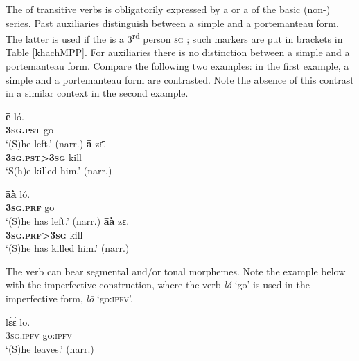 \documentclass[output=paper]{LSP/langsci}
\begin{document}
The  of transitive verbs is obligatorily expressed by a  or a  of the basic (non-) series. Past auxiliaries distinguish between a simple and a portemanteau form. The latter is used if the  is a 3\textsuperscript{rd} person \textsc{sg} ; such markers are put in brackets in  Table \ref{khachMPP}. For  auxiliaries there is no distinction between a simple and a portemanteau form. Compare the following two examples: in the first example, a simple and a portemanteau form are contrasted. Note the absence of this contrast in a similar context in the second example.

\begin{exe} \ex
\label{khachexpst}
\begin{xlist} \ex
\gll \textbf{ē}	ló.\\
\textbf{3\textsc{sg}.\textsc{pst}} go\\
\glt ‘(S)he left.’ (narr.)
\ex
\gll \textbf{ā}		zɛ̄.	\\
\textbf{3\textsc{sg}.\textsc{pst}>3\textsc{sg}}		kill \\
\glt ‘S(h)e killed him.’ (narr.)

\end{xlist}
\end{exe}

\begin{exe} \ex
\label{khachexprf}
\begin{xlist} \ex
\gll \textbf{āà}	ló.	\\
\textbf{3\textsc{sg}.\textsc{prf}}	go	\\
\glt ‘(S)he has left.’ (narr.)
\ex
\gll \textbf{āà}		zɛ̄.\\
\textbf{3\textsc{sg}.\textsc{prf}>3\textsc{sg}}		kill \\
\glt  ‘(S)he has killed him.’ (narr.)
\end{xlist}
\end{exe}


The verb can bear segmental and/or tonal morphemes. Note the example below with the imperfective construction, where the verb \textit{ló} `go' is used in the imperfective form, \textit{lō} `go:\textsc{ipfv}'.

\begin{exe}\ex
\gll lɛ́ɛ̀	lō.	\\
	3\textsc{sg}.\textsc{ipfv} go:\textsc{ipfv}\\
\glt ‘(S)he leaves.’ (narr.)
\end{exe}
\end{document}
